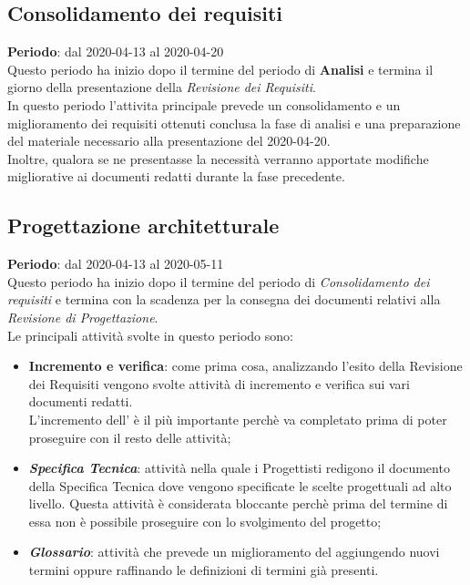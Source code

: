 \subsection{Consolidamento dei requisiti}
\textbf{Periodo}: dal 2020-04-13 al 2020-04-20 \\
Questo periodo ha inizio dopo il termine del periodo di \textbf{Analisi} e termina il giorno della presentazione della \textit{Revisione dei Requisiti}. \\
In questo periodo l'attivita principale prevede un consolidamento e un miglioramento dei requisiti ottenuti conclusa la fase di analisi e una preparazione del materiale necessario alla presentazione del 2020-04-20. \\
Inoltre, qualora se ne presentasse la necessità verranno apportate modifiche migliorative ai documenti redatti durante la fase precedente.

\subsection{Progettazione architetturale}
\textbf{Periodo}: dal 2020-04-13 al 2020-05-11 \\
Questo periodo ha inizio dopo il termine del periodo di \textit{Consolidamento dei requisiti} e termina con la scadenza per la consegna dei documenti relativi alla \textit{Revisione di Progettazione}. \\
Le principali attività svolte in questo periodo sono:
\begin{itemize}
	\item \textbf{Incremento e verifica}: come prima cosa, analizzando l'esito della Revisione dei Requisiti vengono svolte attività di incremento e verifica sui vari documenti redatti. \\
	L'incremento dell'\AdR{} è il più importante perchè va completato prima di poter proseguire con il resto delle attività;
	\item \textbf{\textit{Specifica Tecnica}}: attività nella quale i Progettisti redigono il documento della Specifica Tecnica dove vengono specificate le scelte progettuali ad alto livello.
	Questa attività è considerata bloccante perchè prima del termine di essa non è possibile proseguire con lo svolgimento del progetto;
	\item \textbf{\textit{Glossario}}: attività che prevede un miglioramento del \Glossario aggiungendo nuovi termini oppure raffinando le definizioni di termini già presenti.
\end{itemize}

